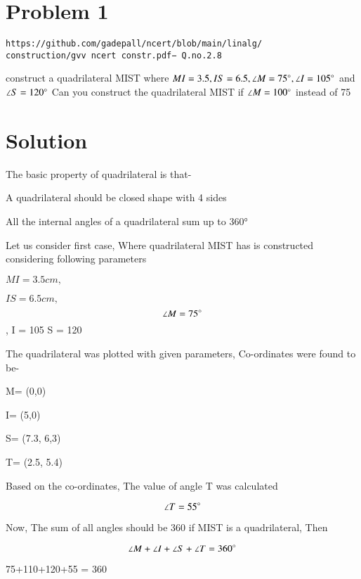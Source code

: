 \documentclass[journal,12pt,twocolumn]{IEEEtran}
\begin{document}
\section{Problem 1}
\begin{lstlisting}
https://github.com/gadepall/ncert/blob/main/linalg/
construction/gvv ncert constr.pdf− Q.no.2.8
\end{lstlisting}
construct a quadrilateral MIST where $MI = 3.5, IS = 6.5, \angle M = 75\degree , \angle I = 105\degree$ and $\angle S = 120\degree$
\newline
Can you construct the quadrilateral MIST if $\angle M = 100\degree $ instead of 75\degree
\section{Solution}
The basic property of quadrilateral is that-

\begin{enumerate}
\begin{lemma}
     \item A quadrilateral should be closed shape with 4 sides
\end{lemma}
\begin{lemma}
     \item All the internal angles of a quadrilateral sum up to 360°
\end{lemma}
\end{enumerate}

Let us consider first case, Where quadrilateral MIST has is constructed considering following parameters

$MI = 3.5 cm,$ 

$IS = 6.5 cm,$
$$\angle M = 75\degree$$ ,
\angle I = 105\degree
\angle S = 120\degree

The quadrilateral was plotted with given parameters,
Co-ordinates were found to be-

M= (0,0)

I= (5,0)

S= (7.3, 6,3)

T= (2.5, 5.4)

Based on the co-ordinates, The value of angle T was calculated

$$\angle T = 55\degree$$

Now, The sum of all angles should be 360\degree
if MIST is a quadrilateral,
Then

$$\angle M+\angle I+\angle S+\angle T= 360\degree$$

75+110+120+55 = 360\degree
\end{document}
